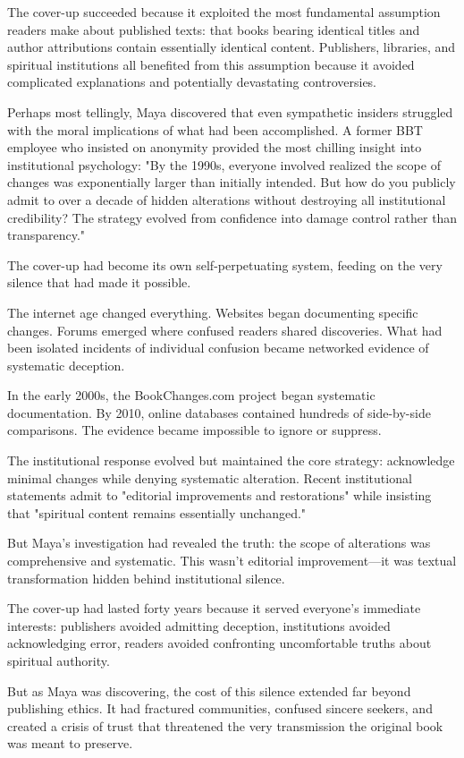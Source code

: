 \documentclass[12pt,twoside]{book}
\begin{document}
The cover-up succeeded because it exploited the most fundamental assumption readers make about published texts: that books bearing identical titles and author attributions contain essentially identical content. Publishers, libraries, and spiritual institutions all benefited from this assumption because it avoided complicated explanations and potentially devastating controversies.

Perhaps most tellingly, Maya discovered that even sympathetic insiders struggled with the moral implications of what had been accomplished. A former BBT employee who insisted on anonymity provided the most chilling insight into institutional psychology: "By the 1990s, everyone involved realized the scope of changes was exponentially larger than initially intended. But how do you publicly admit to over a decade of hidden alterations without destroying all institutional credibility? The strategy evolved from confidence into damage control rather than transparency."

The cover-up had become its own self-perpetuating system, feeding on the very silence that had made it possible.

The internet age changed everything. Websites began documenting specific changes. Forums emerged where confused readers shared discoveries. What had been isolated incidents of individual confusion became networked evidence of systematic deception.

In the early 2000s, the BookChanges.com project began systematic documentation. By 2010, online databases contained hundreds of side-by-side comparisons. The evidence became impossible to ignore or suppress.

The institutional response evolved but maintained the core strategy: acknowledge minimal changes while denying systematic alteration. Recent institutional statements admit to "editorial improvements and restorations" while insisting that "spiritual content remains essentially unchanged."

But Maya's investigation had revealed the truth: the scope of alterations was comprehensive and systematic. This wasn't editorial improvement—it was textual transformation hidden behind institutional silence.

The cover-up had lasted forty years because it served everyone's immediate interests: publishers avoided admitting deception, institutions avoided acknowledging error, readers avoided confronting uncomfortable truths about spiritual authority.

But as Maya was discovering, the cost of this silence extended far beyond publishing ethics. It had fractured communities, confused sincere seekers, and created a crisis of trust that threatened the very transmission the original book was meant to preserve.
\end{document}

